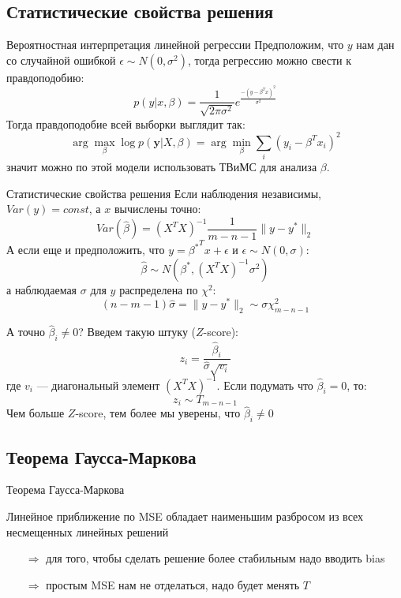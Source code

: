 \documentclass[14pt, fleqn, xcolor={dvipsnames, table}]{beamer}
\begin{document}
\subsection{Статистические свойства решения}

\begin{frame}{Вероятностная интерпретация линейной регрессии}
Предположим, что $y$ нам дан со случайной ошибкой $\epsilon \sim N(0, \sigma^2)$, тогда регрессию можно свести к правдоподобию:
$$
p(y|x, \beta) = \frac{1}{\sqrt{2\pi\sigma^2}} e^{\frac{-(y - \beta^T x)^2}{\sigma^2}}
$$
Тогда правдоподобие всей выборки выглядит так:
$$
\arg \max_\beta \log p(\mathbf{y}|X, \beta) = \arg \min_\beta \sum_i \left(y_i - \beta^Tx_i\right)^2
$$
значит можно по этой модели использовать ТВиМС для анализа $\beta$.
\end{frame}

\begin{frame}{Статистические свойства решения}
Если наблюдения независимы, $Var(y) = const$, а $x$ вычислены точно:
$$
Var(\hat{\beta}) = \left(X^TX\right)^{-1}\frac{1}{m - n - 1}\|y - y^*\|_2
$$
А если еще и предположить, что $y={\beta^*}^Tx + \epsilon$ и $\epsilon \sim N(0,\sigma)$:
$$
\hat{\beta} \sim N(\beta^*, \left(X^TX\right)^{-1}\sigma^2)
$$
а наблюдаемая $\sigma$ для $y$ распределена по $\chi^2$:
$$
(n-m-1)\hat{\sigma} = \|y - y^*\|_2 \sim \sigma \chi^2_{m-n-1}
$$
\end{frame}

\begin{frame}{А точно $\hat{\beta}_i \ne 0$?}
Введем такую штуку ($Z$-score):
$$
z_i = \frac{\hat{\beta}_i}{\hat{\sigma}\sqrt{v_i}}
$$
где $v_i$ --- диагональный элемент $\left(X^TX\right)^{-1}$. Если подумать что $\hat{\beta}_i = 0$, то:
$$
z_i \sim T_{m-n-1}
$$
Чем больше $Z$-score, тем более мы уверены, что $\hat{\beta}_i \ne 0$
\end{frame}

\subsection{Теорема Гаусса-Маркова}
\begin{frame}{Теорема Гаусса-Маркова}
\begin{theorem}[]
Линейное приближение по MSE обладает наименьшим разбросом из всех несмещенных линейных решений
\end{theorem}
\begin{itemize}
\item[$\Rightarrow$] для того, чтобы сделать решение более стабильным надо вводить bias
\item[$\Rightarrow$] простым MSE нам не отделаться, надо будет менять $T$
\end{itemize}
\end{frame}
\end{document}
